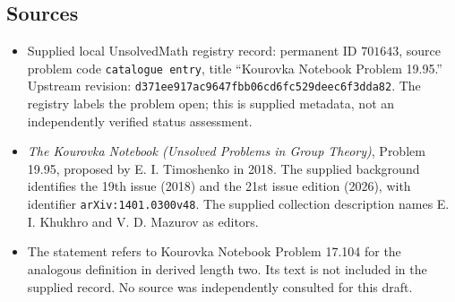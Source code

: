 \documentclass[11pt]{article}
\begin{document}
\subsection{Sources}
\begin{itemize}
\item Supplied local UnsolvedMath registry record: permanent ID \(701643\), source problem code \texttt{catalogue entry}, title ``Kourovka Notebook Problem 19.95.'' Upstream revision: \texttt{d371ee917ac9647fbb06cd6fc529deec6f3dda82}. The registry labels the problem open; this is supplied metadata, not an independently verified status assessment.
\item \emph{The Kourovka Notebook (Unsolved Problems in Group Theory)}, Problem 19.95, proposed by E. I. Timoshenko in 2018. The supplied background identifies the 19th issue (2018) and the 21st issue edition (2026), with identifier \texttt{arXiv:1401.0300v48}. The supplied collection description names E. I. Khukhro and V. D. Mazurov as editors.
\item The statement refers to Kourovka Notebook Problem 17.104 for the analogous definition in derived length two. Its text is not included in the supplied record. No source was independently consulted for this draft.
\end{itemize}
\end{document}
